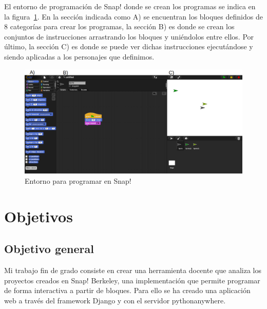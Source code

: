 \documentclass[a4paper, 12pt]{book}
\begin{document}
El entorno de programación de Snap! donde se crean los programas se indica en la figura~\ref{figura:entorno_snapp}. En la sección indicada como A) se encuentran los bloques definidos de 8 categorías para crear los programas, la sección B) es donde se crean los conjuntos de instrucciones arrastrando los bloques y  uniéndolos entre ellos. Por último, la sección C) es donde se puede ver dichas instrucciones ejecutándose y siendo aplicadas a los personajes que definimos.
\begin{figure}[h]
        \centering
        \includegraphics[scale=0.35]{img/entorno.png}
        \caption{Entorno para programar en Snap!}
        \label{figura:entorno_snapp}
\end{figure}

\cleardoublepage %
\chapter{Objetivos} %
\label{chap:objetivos} %

\section{Objetivo general} %
\label{sec:objetivo-general} %

Mi trabajo fin de grado consiste en crear  una herramienta docente que analiza los proyectos creados en Snap! Berkeley, una implementación que permite programar de forma interactiva a partir de bloques. Para ello se ha creado una aplicación web a través del framework Django y con el servidor pythonanywhere.
\end{document}
